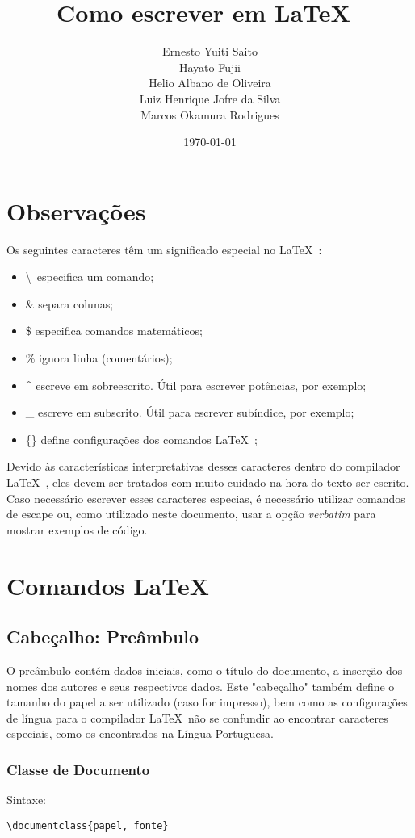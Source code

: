 \documentclass[a4paper,12pt]{article}
\title{Como escrever em \LaTeX\ }
\author{
	Ernesto Yuiti Saito\\
	Hayato Fujii\\
	Helio Albano de Oliveira\\
	Luiz Henrique Jofre da Silva\\
	Marcos Okamura Rodrigues\\
}
\date{\today}
\begin{document}
\maketitle


\section{Observações}
Os seguintes caracteres têm um significado especial no \LaTeX\ :
\begin{itemize}
\item \textbackslash \ especifica um comando;
\item \& separa colunas;
\item \$ especifica comandos matemáticos;
\item \% ignora linha (comentários);
\item \^{} escreve em sobreescrito. Útil para escrever potências, por exemplo;
\item \_  escreve em subscrito. Útil para escrever subíndice, por exemplo;
\item \{\} define configurações dos comandos \LaTeX\ ;
\end{itemize}
Devido às características interpretativas desses caracteres dentro do compilador \LaTeX\ , eles devem ser tratados com muito cuidado na hora do texto ser escrito. Caso necessário escrever esses caracteres especias, é necessário utilizar comandos de escape ou, como utilizado neste documento, usar a opção \textit{verbatim} para mostrar exemplos de código.

\section{Comandos \LaTeX\ }
\subsection{Cabeçalho: Preâmbulo}
O preâmbulo contém dados iniciais, como o título do documento, a inserção dos nomes dos autores e seus respectivos dados. Este "cabeçalho" também define o tamanho do papel a ser utilizado (caso for impresso), bem como as configurações de língua para o compilador \LaTeX\ não se confundir ao encontrar caracteres especiais, como os encontrados na Língua Portuguesa.

\subsubsection{Classe de Documento}
Sintaxe:
\begin{verbatim}
\documentclass{papel, fonte}
\end{verbatim}
\end{document}
